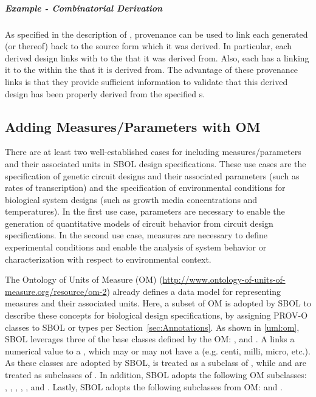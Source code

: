 \clearpage

\subparagraph{Example - Combinatorial Derivation}

As specified in the description of , provenance can be used to link each generated  (or  thereof) back to the source form which it was derived.
In particular, each derived design links with  to the  that it was derived from.  Also, each  has a  linking it to the  within the  that it is derived from.  The advantage of these provenance links is that they provide sufficient information to validate that this derived design has been properly derived from the specified s.

\subsection{Adding Measures/Parameters with OM}
\label{sec:parameters}

There are at least two well-established cases for including measures/parameters and their associated units in SBOL design specifications. These use cases are the specification of genetic circuit designs and their associated parameters (such as rates of transcription) and the specification of environmental conditions for biological system designs (such as growth media concentrations and temperatures). In the first use case, parameters are necessary to enable the generation of quantitative models of circuit behavior from circuit design specifications. In the second use case, measures are necessary to define experimental conditions and enable the analysis of system behavior or characterization with respect to environmental context.

The Ontology of Units of Measure (OM) (\url{http://www.ontology-of-units-of-measure.org/resource/om-2}) already defines a data model for representing measures and their associated units. Here, a subset of OM is adopted by SBOL to describe these concepts for biological design specifications,
by assigning PROV-O classes to SBOL  or  types per  Section~\ref{sec:Annotations}.
%
As shown in \ref{uml:om}, SBOL leverages three of the base classes defined by the OM: ,  and . A  links a numerical value to a , which may or may not have a  (e.g. centi, milli, micro, etc.). As these classes are adopted by SBOL,  is treated as a subclass of , while  and  are treated as subclasses of . In addition, SBOL adopts the following OM  subclasses: , , , , , and . Lastly, SBOL adopts the following  subclasses from OM:  and .

